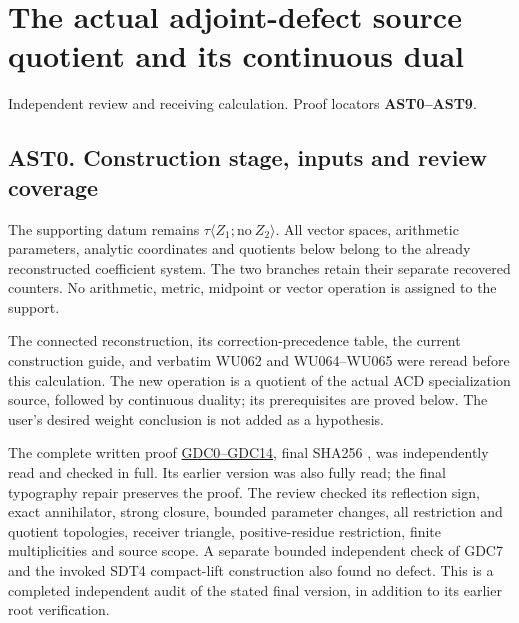 \chapter{The actual adjoint-defect source quotient and its continuous
dual}\label{the-actual-adjoint-defect-source-quotient-and-its-continuous-dual}

Independent review and receiving calculation. Proof locators
\textbf{AST0--AST9}.

\section{AST0. Construction stage, inputs and review
coverage}\label{ast0.-construction-stage-inputs-and-review-coverage}

The supporting datum remains
\(\tau\langle Z_1;\mathrm{no}\ Z_2\rangle\). All vector spaces,
arithmetic parameters, analytic coordinates and quotients below belong
to the already reconstructed coefficient system. The two branches retain
their separate recovered counters. No arithmetic, metric, midpoint or
vector operation is assigned to the support.

The connected reconstruction, its correction-precedence table, the
current construction guide, and verbatim WU062 and WU064--WU065 were
reread before this calculation. The new operation is a quotient of the
actual ACD specialization source, followed by continuous duality; its
prerequisites are proved below. The user's desired weight conclusion is
not added as a hypothesis.

The complete written proof
\href{https://github.com/KokunoYumeto/zeta-function-research-reader/blob/main/workbenches/splitzero-tandem/continuations/20260925-full-source-tensor-and-original-divisor/gct/GYSIN_DEFECT_CLOSURE_AND_POSITIVE_RECEIVER.md}{GDC0--GDC14},
final SHA256
,
was independently read and checked in full. Its earlier version
was also fully read; the final typography repair preserves the proof.
The review checked its reflection sign, exact annihilator, strong
closure, bounded parameter changes, all restriction and quotient
topologies, receiver triangle, positive-residue restriction, finite
multiplicities and source scope. A separate bounded independent check of
GDC7 and the invoked SDT4 compact-lift construction also found no
defect. This is a completed independent audit of the stated final
version, in addition to its earlier root verification.

